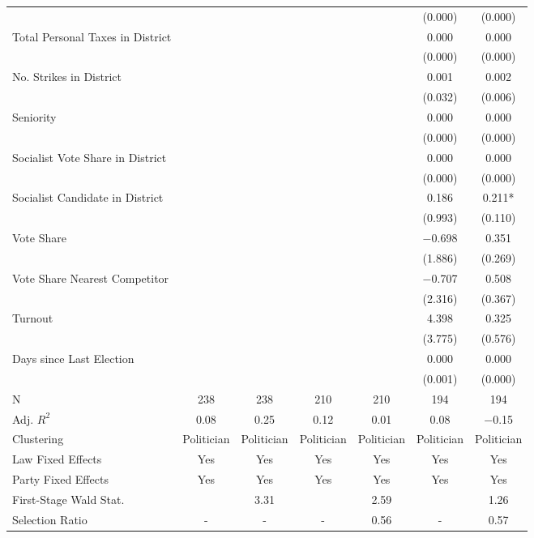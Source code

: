 \begin{table}[!h]
{\begin{threeparttable}
\begin{tabular}[t]{lcccccc}
 &  &  &  &  & (\num{0.000}) & \vphantom{3} (\num{0.000})\\
Total Personal Taxes in District &  &  &  &  & \num{0.000} & \num{0.000}\\
 &  &  &  &  & (\num{0.000}) & \vphantom{2} (\num{0.000})\\
No. Strikes in District &  &  &  &  & \num{0.001} & \num{0.002}\\
 &  &  &  &  & (\num{0.032}) & (\num{0.006})\\
Seniority &  &  &  &  & \num{0.000} & \num{0.000}\\
 &  &  &  &  & (\num{0.000}) & \vphantom{1} (\num{0.000})\\
Socialist Vote Share in District &  &  &  &  & \num{0.000} & \num{0.000}\\
 &  &  &  &  & (\num{0.000}) & (\num{0.000})\\
Socialist Candidate in District &  &  &  &  & \num{0.186} & \num{0.211}*\\
 &  &  &  &  & (\num{0.993}) & (\num{0.110})\\
Vote Share &  &  &  &  & \num{-0.698} & \num{0.351}\\
 &  &  &  &  & (\num{1.886}) & (\num{0.269})\\
Vote Share Nearest Competitor &  &  &  &  & \num{-0.707} & \num{0.508}\\
 &  &  &  &  & (\num{2.316}) & (\num{0.367})\\
Turnout &  &  &  &  & \num{4.398} & \num{0.325}\\
 &  &  &  &  & (\num{3.775}) & (\num{0.576})\\
Days since Last Election &  &  &  &  & \num{0.000} & \num{0.000}\\
 &  &  &  &  & (\num{0.001}) & (\num{0.000})\\
\midrule
N & \num{238} & \num{238} & \num{210} & \num{210} & \num{194} & \num{194}\\
Adj. $R^2$ & \num{0.08} & \num{0.25} & \num{0.12} & \num{0.01} & \num{0.08} & \num{-0.15}\\
Clustering & Politician & Politician & Politician & Politician & Politician & Politician\\
Law Fixed Effects & Yes & Yes & Yes & Yes & Yes & Yes\\
Party Fixed Effects & Yes & Yes & Yes & Yes & Yes & Yes\\
First-Stage Wald Stat. &  & 3.31 &  & 2.59 &  & 1.26\\
Selection Ratio & - & - & - & 0.56 & - & 0.57\\

\end{tabular}
\end{threeparttable}}
\end{table}
